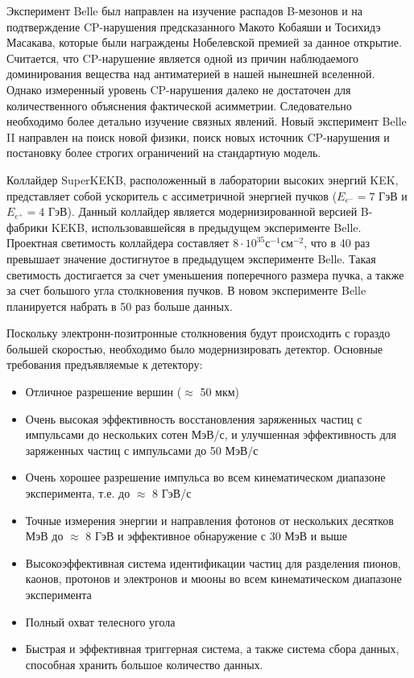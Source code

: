   Эксперимент Belle был направлен на изучение распадов B-мезонов и на подтверждение CP-нарушения предсказанного Макото Кобаяши и Тосихидэ Масакава, которые были награждены Нобелевской премией за данное открытие. Считается, что CP-нарушение является одной из причин наблюдаемого доминирования вещества над антиматерией в нашей нынешней вселенной. Однако измеренный уровень CP-нарушения далеко не достаточен для количественного объяснения фактической асимметрии. Следовательно необходимо более детально изучение связных явлений. Новый эксперимент Belle II направлен на поиск новой физики, поиск новых источник CP-нарушения и постановку более строгих ограничений на стандартную модель.\par 
Коллайдер SuperKEKB, расположенный в лаборатории высоких энергий KEK, представляет собой ускоритель с ассиметричной энергией пучков ($E_{e^-}=7$ ГэВ и $E_{e^+}=4$ ГэВ). Данный коллайдер является модернизированной версией B-фабрики KEKB, использовавшейсяя в предыдущем эксперименте Belle. Проектная светимость коллайдера составляет $8\cdot10^{35}$с$^{-1}$см$^{-2}$, что в 40 раз превышает значение достигнутое в предыдущем эксперименте Belle. Такая светимость достигается за счет уменьшения поперечного размера пучка, а также за счет большого угла столкновения пучков. В новом эксперименте Belle планируется набрать в 50 раз больше данных.\par
  Поскольку электронн-позитронные столкновения будут происходить с гораздо большей скоростью, необходимо было модернизировать детектор. Основные требования предъявляемые к детектору: 
\begin{itemize}
  \item Отличное разрешение вершин ($\approx$ 50 мкм)
  \item Очень высокая эффективность восстановления заряженных частиц с импульсами до нескольких сотен МэВ/с, и улучшенная эффективность для заряженных частиц с импульсами до 50 МэВ/с
  \item Очень хорошее разрешение импульса во всем кинематическом диапазоне эксперимента, т.е. до $\approx$ 8 ГэВ/с
  \item Точные измерения энергии и направления фотонов от нескольких десятков МэВ до $\approx$ 8 ГэВ и эффективное обнаружение с 30 МэВ и выше
  \item Высокоэффективная система идентификации частиц для разделения пионов, каонов, протонов и электронов и мюоны во всем кинематическом диапазоне эксперимента
  \item Полный охват телесного угола
  \item Быстрая и эффективная триггерная система, а также система сбора данных, способная хранить большое количество данных.
\end{itemize} \par

